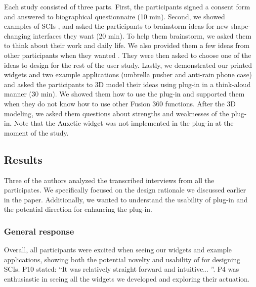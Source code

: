       Each study consisted of three parts. First, the participants signed a
      consent form and answered to biographical questionnaire (10 min). Second,
      we showed examples of SCIs \cite{Follmer:2013, Yao:2013}, and asked the
      participants to brainstorm ideas for new shape-changing interfaces they
      want (20 min). To help them brainstorm, we asked them to think about their
      work and daily life. We also provided them a few ideas from other
      participants when they wanted \cite{Siangliulue:2015}. They were then
      asked to choose one of the ideas to design for the rest of the user study.
      Lastly, we demonstrated our printed widgets and two example applications
      (umbrella pusher and anti-rain phone case) and asked the participants to
      3D model their ideas using \mp plug-in in a think-aloud manner (30 min).
      We showed them how to use the plug-in and supported them when they do not
      know how to use other Fusion 360 functions. After the 3D modeling, we
      asked them questions about strengths and weaknesses of the \mp plug-in.
      Note that the Auxetic widget was not implemented in the plug-in at the
      moment of the study.

    \newpage
    \subsection{Results}
      Three of the authors analyzed the transcribed interviews from all the
      participates. We specifically focused on the design rationale we discussed
      earlier in the paper. Additionally, we wanted to understand the usability
      of \mp plug-in and the potential direction for enhancing the plug-in.
          
      \subsubsection{General response}
        Overall, all participants were excited when seeing our widgets and
        example applications, showing both the potential novelty and usability
        of \mp for designing SCIs. P10 stated: ``It was relatively straight
        forward and intuitive... ''. P4 was enthusiastic in seeing all the
        widgets we developed and exploring their actuation. 
        
